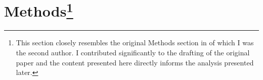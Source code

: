 


\section[Methods]{Methods\footnote{This section closely resembles the original Methods section in \citep{Erfanian2021Psychological} of which I was the second author. I contributed significantly to the drafting of the original paper and the content presented here directly informs the analysis presented later.}}

